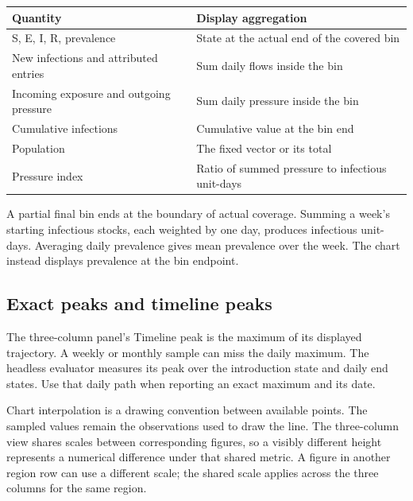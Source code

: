 \documentclass[11pt,a4paper]{article}
\begin{document}
\begin{longtable}[]{@{}
  >{\raggedright\arraybackslash}p{}
  >{\raggedright\arraybackslash}p{}@{}}
\toprule\noalign{}
\begin{minipage}[b]{\linewidth}\raggedright
Quantity
\end{minipage} & \begin{minipage}[b]{\linewidth}\raggedright
Display aggregation
\end{minipage} \\
\midrule\noalign{}
\endhead
\bottomrule\noalign{}
\endlastfoot
S, E, I, R, prevalence & State at the actual end of the covered bin \\
New infections and attributed entries & Sum daily flows inside the
bin \\
Incoming exposure and outgoing pressure & Sum daily pressure inside the
bin \\
Cumulative infections & Cumulative value at the bin end \\
Population & The fixed vector or its total \\
Pressure index & Ratio of summed pressure to infectious unit-days \\
\end{longtable}

A partial final bin ends at the boundary of actual coverage. Summing a
week's starting infectious stocks, each weighted by one day, produces
infectious unit-days. Averaging daily prevalence gives mean prevalence
over the week. The chart instead displays prevalence at the bin
endpoint.

\subsection{Exact peaks and timeline
peaks}\label{exact-peaks-and-timeline-peaks}

The three-column panel's Timeline peak is the maximum of its displayed
trajectory. A weekly or monthly sample can miss the daily maximum. The
headless evaluator measures its peak over the introduction state and
daily end states. Use that daily path when reporting an exact maximum
and its date.

Chart interpolation is a drawing convention between available points.
The sampled values remain the observations used to draw the line. The
three-column view shares scales between corresponding figures, so a
visibly different height represents a numerical difference under that
shared metric. A figure in another region row can use a different scale;
the shared scale applies across the three columns for the same region.
\end{document}
